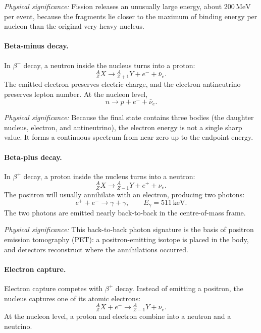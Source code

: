 \textit{Physical significance:} Fission releases an unusually large energy,
about $200\,\mathrm{MeV}$ per event, because the fragments lie closer to the
maximum of binding energy per nucleon than the original very heavy nucleus.

\paragraph{Beta-minus decay.}
In $\beta^{-}$ decay, a neutron inside the nucleus turns into a proton:
\begin{equation}
  \label{eq:lec05:beta_minus_decay}
  \boxed{{}^{A}_{Z}X\rightarrow{}^{A}_{Z+1}Y+e^{-}+\bar{\nu}_{e}.}
\end{equation}
The emitted electron preserves electric charge, and the electron antineutrino
preserves lepton number.  At the nucleon level,
\begin{equation}
  \label{eq:lec05:neutron_beta_decay}
  n\rightarrow p+e^{-}+\bar{\nu}_{e}.
\end{equation}

\textit{Physical significance:} Because the final state contains three bodies
(the daughter nucleus, electron, and antineutrino), the electron energy is not a
single sharp value.  It forms a continuous spectrum from near zero up to the
endpoint energy.

\paragraph{Beta-plus decay.}
In $\beta^{+}$ decay, a proton inside the nucleus turns into a neutron:
\begin{equation}
  \label{eq:lec05:beta_plus_decay}
  \boxed{{}^{A}_{Z}X\rightarrow{}^{A}_{Z-1}Y+e^{+}+\nu_{e}.}
\end{equation}
The positron will usually annihilate with an electron, producing two photons:
\begin{equation}
  \label{eq:lec05:positron_annihilation}
  e^{+}+e^{-}\rightarrow\gamma+\gamma,
  \qquad E_{\gamma}=511\,\mathrm{keV}.
\end{equation}
The two photons are emitted nearly back-to-back in the centre-of-mass frame.

\textit{Physical significance:} This back-to-back photon signature is the basis
of positron emission tomography (PET): a positron-emitting isotope is placed in
the body, and detectors reconstruct where the annihilations occurred.

\paragraph{Electron capture.}
Electron capture competes with $\beta^{+}$ decay.  Instead of emitting a
positron, the nucleus captures one of its atomic electrons:
\begin{equation}
  \label{eq:lec05:electron_capture}
  \boxed{{}^{A}_{Z}X+e^{-}\rightarrow{}^{A}_{Z-1}Y+\nu_{e}.}
\end{equation}
At the nucleon level, a proton and electron combine into a neutron and a
neutrino.

